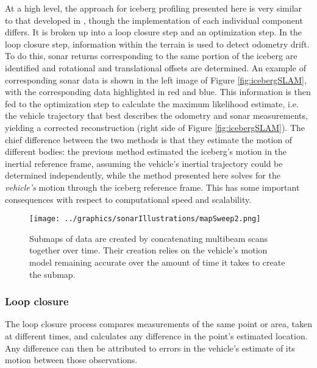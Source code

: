 At a high level, the approach for iceberg profiling presented here is very similar to that developed in \cite{Kimball2011b}, though the implementation of each individual component differs. It is broken up into a loop closure step and an optimization step. In the loop closure step, information within the terrain is used to detect odometry drift. To do this, sonar returns corresponding to the same portion of the iceberg are identified and rotational and translational offsets are determined. An example of corresponding sonar data is shown in the left image of Figure \ref{fig:icebergSLAM}, with the corresponding data highlighted in red and blue. This information is then fed to the optimization step to calculate the maximum likelihood estimate, i.e. the vehicle trajectory that best describes the odometry and sonar measurements, yielding a corrected reconstruction (right side of Figure \ref{fig:icebergSLAM}). The chief difference between the two methods is that they estimate the motion of different bodies: the previous method estimated the iceberg's motion in the inertial reference frame, assuming the vehicle's inertial trajectory could be determined independently, while the method presented here solves for the \emph{vehicle's} motion through the iceberg reference frame. This has some important consequences with respect to computational speed and scalability. 


 \begin{figure}[htb]
   \centering
   \texttt{[image: ../graphics/sonarIllustrations/mapSweep2.png]} %
   \caption{Submaps of data are created by concatenating multibeam scans together over time. Their creation relies on the vehicle's motion model remaining accurate over the amount of time it takes to create the submap.}
   \label{fig:SubmapGeneration}
\end{figure}

\subsubsection{Loop closure}
\label{sec:explicitDataCorr}
The loop closure process compares measurements of the same point or area, taken at different times, and calculates any difference in the point's estimated location. Any difference can then be attributed to errors in the vehicle's estimate of its motion between those observations.

